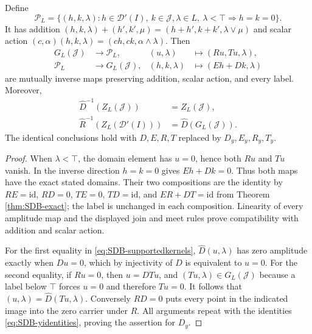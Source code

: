 \begin{proposition}
\label{prop:SDB-latticesplitting}
Define
\begin{equation}\tag{SDB36}\label{eq:SDB-sharedlabel}
 \mathcal P_L=
 \{(h,k,\lambda):h\in\mathcal D'(I),\ k\in\mathcal J,
       \lambda\in L,\ \lambda<\top\Rightarrow h=k=0\}.
\end{equation}
It has addition
$(h,k,\lambda)+(h',k',\mu)=(h+h',k+k',\lambda\vee\mu)$
and scalar action
$(c,\alpha)(h,k,\lambda)=(ch,ck,\alpha\wedge\lambda)$.
Then
\begin{equation}\tag{SDB37}\label{eq:SDB-latticesplitting}
 \begin{aligned}
 G_L(\mathcal J)&\longrightarrow\mathcal P_L,
       &(u,\lambda)&\longmapsto(Ru,Tu,\lambda),\\
 \mathcal P_L&\longrightarrow G_L(\mathcal J),
       &(h,k,\lambda)&\longmapsto(Eh+Dk,\lambda)
 \end{aligned}
\end{equation}
are mutually inverse maps preserving addition, scalar action, and
every label. Moreover,
\begin{equation}\tag{SDB38}\label{eq:SDB-supportedkernels}
 \begin{aligned}
 \widehat D^{-1}(Z_L(\mathcal J))&=Z_L(\mathcal J),\\
 \widehat R^{-1}(Z_L(\mathcal D'(I)))
      &=\widehat D(G_L(\mathcal J)).
 \end{aligned}
\end{equation}
The identical conclusions hold with $D,E,R,T$ replaced by
$D_y,E_y,R_y,T_y$.
\end{proposition}
\begin{proof}
When $\lambda<\top$, the domain element has $u=0$, hence both
$Ru$ and $Tu$ vanish. In the inverse direction $h=k=0$ gives
$Eh+Dk=0$. Thus both maps have the exact stated domains.
Their two compositions are the identity by
$RE=\mathrm{id}$, $RD=0$, $TE=0$, $TD=\mathrm{id}$, and
$ER+DT=\mathrm{id}$ from Theorem \ref{thm:SDB-exact}; the label
is unchanged in each composition. Linearity of every amplitude map
and the displayed join and meet rules prove compatibility with
addition and scalar action.

For the first equality in \eqref{eq:SDB-supportedkernels},
$\widehat D(u,\lambda)$ has zero amplitude exactly when $Du=0$,
which by injectivity of $D$ is equivalent to $u=0$.
For the second equality, if $Ru=0$, then $u=DTu$, and
$(Tu,\lambda)\in G_L(\mathcal J)$ because a label below $\top$
forces $u=0$ and therefore $Tu=0$. It follows that
$(u,\lambda)=\widehat D(Tu,\lambda)$.
Conversely $RD=0$ puts every point in the indicated image into the
zero carrier under $\widehat R$.
All arguments repeat with the identities
\eqref{eq:SDB-yidentities}, proving the assertion for $D_y$.
\end{proof}

